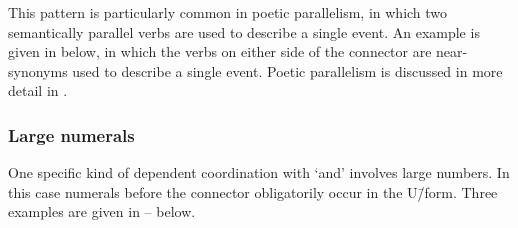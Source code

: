\begin{exe}
	\label{ex:120715-3, 0.14}
\end{exe}

This pattern is particularly common in poetic parallelism,
in which two semantically parallel verbs are used to describe a single event.
An example is given in  below,
in which the verbs on either side of the connector 
are near-synonyms used to describe a single event.
Poetic parallelism is discussed in more detail in .

\begin{exe}
	\label{ex:160326, 1.50}
\end{exe}

\subsubsection{Large numerals}\label{sec:LarNum}
One specific kind of dependent coordination with  `and' involves large numbers.
In this case numerals before the connector  obligatorily occur in the U\=/form.
Three examples are given in -- below.

